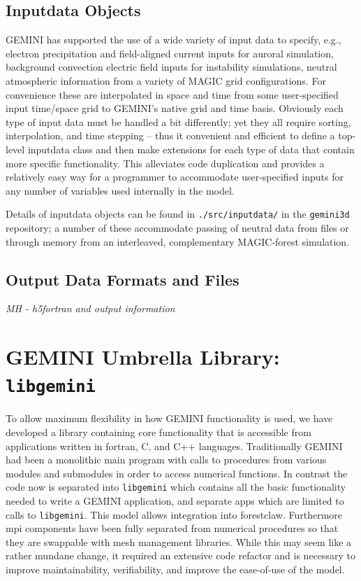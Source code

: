 \documentclass[11pt,letterpaper]{article}
\begin{document}
\subsection{Inputdata Objects}

GEMINI has supported the use of a wide variety of input data to specify, e.g., electron precipitation and field-aligned current inputs for auroral simulation, background convection electric field inputs for instability simulations, neutral atmospheric information from a variety of MAGIC grid configurations.  For convenience these are interpolated in space and time from some user-specified input time/space grid to GEMINI's native grid and time basis.  Obviously each type of input data must be handled a bit differently; yet they all require sorting, interpolation, and time stepping -- thus it convenient and efficient to define a top-level inputdata class and then make extensions for each type of data that contain more specific functionality.  This alleviates code duplication and provides a relatively easy way for a programmer to accommodate user-specified inputs for any number of variables used internally in the model.  

Details of inputdata objects can be found in \texttt{./src/inputdata/} in the \texttt{gemini3d} repository; a number of these accommodate passing of neutral data from files or through memory from an interleaved, complementary MAGIC-forest simulation.  


\subsection{Output Data Formats and Files}

\emph{MH - h5fortran and output information}



\section{GEMINI Umbrella Library:  \texttt{libgemini}}

To allow maximum flexibility in how GEMINI functionality is used, we have developed a library containing core functionality that is accessible from applications written in fortran, C, and C++ languages.  Traditionally GEMINI had been a monolithic main program with calls to procedures from various modules and submodules in order to access numerical functions.  In contrast the code now is separated into \texttt{libgemini} which contains all the basic functionality needed to write a GEMINI application, and separate apps which are limited to calls to \texttt{libgemini}.  This model allows integration into forestclaw.  Furthermore mpi components have been fully separated from numerical procedures so that they are swappable with mesh management libraries.  While this may seem like a rather mundane change, it required an extensive code refactor and is necessary to improve maintainability, verifiability, and improve the ease-of-use of the model.  
\end{document}
